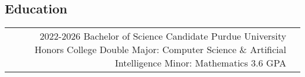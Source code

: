 \documentclass[
	10pt, %
]{FreemanCV}
\begin{document}
\begin{paracol}{2}

	\section{Education}




	\begin{supertabular}{r l} %


		\qualificationentry
		{2022-2026} %
		{Bachelor of Science Candidate} %
		{Purdue University Honors College} %
		{Double Major: Computer Science \& Artificial Intelligence} %
		{Minor: Mathematics}
		{3.6 GPA} %




	\end{supertabular}




\end{paracol}
\end{document}

